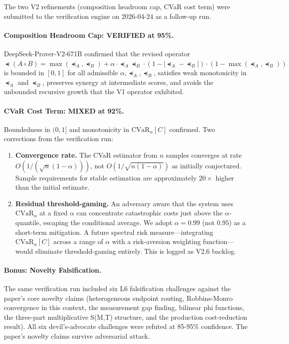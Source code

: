 The two V2 refinements (composition headroom cap, CVaR cost term) were submitted to the verification engine on 2026-04-24 as a follow-up run.

\paragraph{Composition Headroom Cap: VERIFIED at 95\%.}
DeepSeek-Prover-V2-671B confirmed that the revised operator $\smt(A \circ B) = \max(\smt_A, \smt_B) + \alpha \cdot \smt_A \smt_B \cdot (1 - |\smt_A - \smt_B|) \cdot (1 - \max(\smt_A, \smt_B))$ is bounded in $[0,1]$ for all admissible $\alpha, \smt_A, \smt_B$, satisfies weak monotonicity in $\smt_A$ and $\smt_B$, preserves synergy at intermediate scores, and avoids the unbounded recursive growth that the V1 operator exhibited.

\paragraph{CVaR Cost Term: MIXED at 92\%.}
Boundedness in $(0,1]$ and monotonicity in $\text{CVaR}_\alpha[C]$ confirmed. Two corrections from the verification run:

\begin{enumerate}
    \item \textbf{Convergence rate.} The CVaR estimator from $n$ samples converges at rate $O(1/(\sqrt{n}(1-\alpha)))$, not $O(1/\sqrt{n(1-\alpha)})$ as initially conjectured. Sample requirements for stable estimation are approximately $20\times$ higher than the initial estimate.
    \item \textbf{Residual threshold-gaming.} An adversary aware that the system uses $\text{CVaR}_{\alpha}$ at a fixed $\alpha$ can concentrate catastrophic costs just above the $\alpha$-quantile, escaping the conditional average. We adopt $\alpha = 0.99$ (not $0.95$) as a short-term mitigation. A future spectral risk measure---integrating $\text{CVaR}_\alpha[C]$ across a range of $\alpha$ with a risk-aversion weighting function---would eliminate threshold-gaming entirely. This is logged as V2.6 backlog.
\end{enumerate}

\paragraph{Bonus: Novelty Falsification.}
The same verification run included six L6 falsification challenges against the paper's core novelty claims (heterogeneous endpoint routing, Robbins-Monro convergence in this context, the measurement gap finding, bilinear phi functions, the three-part multiplicative S(M,T) structure, and the production cost-reduction result). All six devil's-advocate challenges were refuted at 85-95\% confidence. The paper's novelty claims survive adversarial attack.
